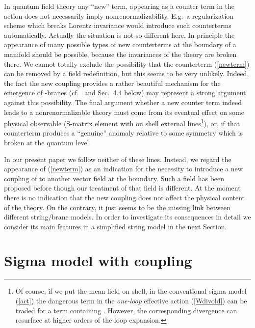 \documentclass[a4paper,12pt]{article}
\begin{document}
In quantum field theory any 
``new'' term, appearing as a counter term in the action does not 
necessarily imply nonrenormalizability. E.g.\ a 
regularization scheme which breaks Lorentz invariance would 
introduce such counterterms automatically. Actually the 
situation is not so different here. In principle the 
appearance of many possible types of new counterterms at 
the boundary of a manifold should be possible, because the 
invariances of the theory are broken there.  
We cannot totally exclude the possibility that the counterterm
(\ref{newterm}) can be removed by a field redefinition, but
this seems to be very unlikely. Indeed, the fact the new coupling 
provides a rather beautiful mechanism for 
the emergence of \coordHE{}-branes (cf.\ \cite{DLP89,Leigh89} and 
Sec.\ 4.4 below) may represent a strong argument against this 
possibility.
The final 
argument whether a new counter term indeed leads to a 
nonrenormalizable theory must come from its eventual 
effect on some physical observable (S-matrix element with 
on shell external lines\footnote{Of course, if we put the mean
field \coordHE{} on shell, in the conventional sigma model (\ref{act})
the dangerous term \coordHE{} in the {\it one-loop}
effective action (\ref{Wdivold})
can be traded for a term containing \coordHE{}
\cite{Callan88}. However, the corresponding divergence can
resurface at higher orders of the loop expansion.}), 
or, if that counterterm produces a 
``genuine'' anomaly relative to some symmetry which is 
broken at the quantum level. 

In our present paper we follow neither of these lines. 
Instead, we regard the appearance of (\ref{newterm}) as an indication 
for the necessity to introduce a new coupling of 
\coordHE{} to another 
vector field \coordHE{} at the boundary. 
Such a field has been 
proposed before 
\cite{dornotto86,DLP89,Leigh89,behrndtdorn92,dornotto96,Ellis97,Mavromatos99}
though our treatment of that field is different.
At the moment there is
no indication that the new coupling does not affect the physical
content of the theory. On the contrary, it just seems to be 
the missing link between different string/brane models.
In order to investigate its 
consequences in detail we consider its main features in a 
simplified string model in the next Section. 

\section{Sigma model with \coordHE{} coupling}
\end{document}
